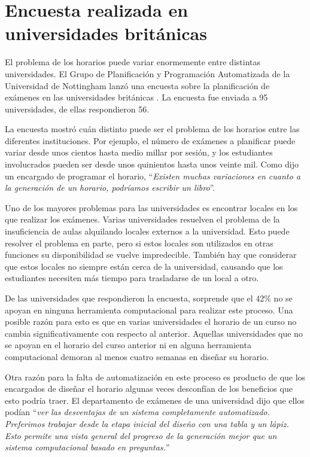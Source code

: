 \section{Encuesta realizada en universidades británicas}

El problema de los horarios puede variar enormemente entre distintas universidades. El Grupo de Planificación
y Programación Automatizada de la Universidad de Nottingham lanzó una encuesta sobre la planificación de exámenes en las universidades británicas \cite{survey of University of Nottingham}. La encuesta fue enviada a 95 universidades, de ellas respondieron 56.

La encuesta mostró cuán distinto puede ser el problema de los horarios entre las diferentes instituciones.
Por ejemplo, el número de exámenes a planificar puede variar desde unos cientos hasta medio millar por sesión,
y los estudiantes involucrados pueden ser desde unos quinientos hasta unos veinte mil. Como dijo un
encargado de programar el horario, ``\emph{Existen muchas variaciones en cuanto a la generación de un horario,
podr\'iamos escribir un libro}''.

Uno de los mayores problemas para las universidades es encontrar locales en los que realizar los exámenes.
Varias universidades resuelven el problema de la insuficiencia de aulas alquilando locales externos a la
universidad. Esto puede resolver el problema en parte, pero si estos locales son utilizados en otras funciones
su disponibilidad se vuelve impredecible. También hay que considerar que estos locales no siempre están cerca de
la universidad, causando que los estudiantes necesiten más tiempo para trasladarse de un local a otro.

De las universidades que respondieron la encuesta, sorprende que el 42\% no se apoyan en ninguna herramienta
computacional para realizar este proceso. Una posible razón para esto es que en varias universidades el
horario de un curso no cambia significativamente con respecto al anterior. Aquellas universidades que no
se apoyan en el horario del curso anterior ni en alguna herramienta computacional demoran al menos cuatro
semanas en diseñar su horario.

Otra razón para la falta de automatización en este proceso es producto de que los encargados de diseñar el horario
algunas veces desconf\'ian de los beneficios que esto podr\'ia traer. El departamento de exámenes de una universidad
dijo que ellos pod\'ian ``\emph{ver las desventajas de un sistema completamente automatizado. Preferimos trabajar
desde la etapa inicial del diseño con una tabla y un l\'apiz. Esto permite una vista general del progreso de la
generación mejor que un sistema computacional basado en preguntas.}''

